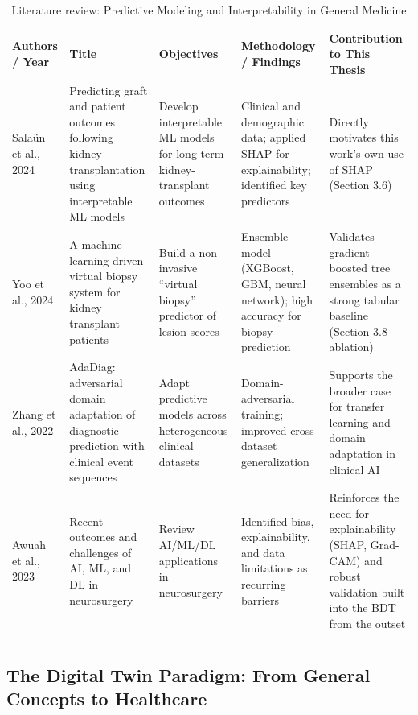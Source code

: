 \documentclass[pdflatex,sn-mathphys-num]{sn-jnl}%
\theoremstyle{thmstyleone}%
\theoremstyle{thmstyletwo}%
\theoremstyle{thmstylethree}%
\begin{document}
\begin{table}
\caption*{Literature review: Predictive Modeling and Interpretability in General Medicine}\label{tabRW1}
\scriptsize
\begin{tabular}{@{}p{0.10\textheight}p{0.17\textheight}p{0.15\textheight}p{0.27\textheight}p{0.18\textheight}@{}}
\toprule
\textbf{Authors / Year} & \textbf{Title} & \textbf{Objectives} & \textbf{Methodology / Findings} & \textbf{Contribution to This Thesis} \\
\midrule
Salaün et al., 2024 \cite{bib1} & Predicting graft and patient outcomes following kidney transplantation using interpretable ML models & Develop interpretable ML models for long-term kidney-transplant outcomes & Clinical and demographic data; applied SHAP for explainability; identified key predictors & Directly motivates this work's own use of SHAP (Section 3.6) \\
\addlinespace
Yoo et al., 2024 \cite{bib2} & A machine learning-driven virtual biopsy system for kidney transplant patients & Build a non-invasive ``virtual biopsy'' predictor of lesion scores & Ensemble model (XGBoost, GBM, neural network); high accuracy for biopsy prediction & Validates gradient-boosted tree ensembles as a strong tabular baseline (Section 3.8 ablation) \\
\addlinespace
Zhang et al., 2022 \cite{bib3} & AdaDiag: adversarial domain adaptation of diagnostic prediction with clinical event sequences & Adapt predictive models across heterogeneous clinical datasets & Domain-adversarial training; improved cross-dataset generalization & Supports the broader case for transfer learning and domain adaptation in clinical AI \\
\addlinespace
Awuah et al., 2023 \cite{bib4} & Recent outcomes and challenges of AI, ML, and DL in neurosurgery & Review AI/ML/DL applications in neurosurgery & Identified bias, explainability, and data limitations as recurring barriers & Reinforces the need for explainability (SHAP, Grad-CAM) and robust validation built into the BDT from the outset \\
\addlinespace
\botrule
\end{tabular}
\end{table}
\FloatBarrier

\subsection{The Digital Twin Paradigm: From General Concepts to Healthcare}\label{sec2_2}
\end{document}

